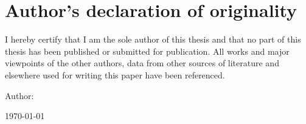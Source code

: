 \section*{\centering Author's declaration of originality}
I hereby certify that I am the sole author of this thesis and that no part of this thesis has been published or submitted for publication.
All works and major viewpoints of the other authors, data from other sources of literature and elsewhere used for writing this paper have been referenced.


Author: \nameofauthor

\today
\pagebreak